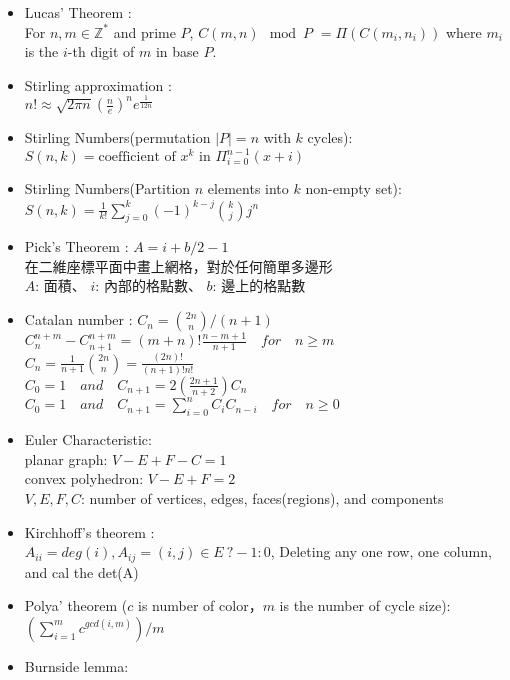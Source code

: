 \begin{itemize}
\item Lucas’ Theorem :\\
  For $n, m \in \mathbb{Z}^{*}$ and prime $P$,
  $C(m,n) \mod P$
	$= \Pi ( C(m_i,n_i) )$
  where $m_i$ is the $i$-th digit of $m$ in base $P$.
\item Stirling approximation : \\
  $n!\approx\sqrt{ 2 \pi n}(\frac{n}{e})^{n}e^\frac{1}{12n}$
\item Stirling Numbers(permutation $|P|=n$ with $k$ cycles): \\
  $S(n,k) = \text{coefficient of }x^k \text{ in } \Pi_{i=0}^{n-1} (x+i)$
\item Stirling Numbers(Partition $n$ elements into $k$ non-empty set): \\
  $S(n,k) = \frac{1}{k!} \sum\limits_{j=0}^k (-1)^{k-j} {k \choose j} j^n$
\item Pick’s Theorem : $A = i + b/2 - 1$\\
	在二維座標平面中畫上網格，對於任何簡單多邊形\\
  $A$: 面積、 $i$: 內部的格點數、 $b$: 邊上的格點數
\item Catalan number : $C_n = {2n \choose n}/(n+1)$\\
  $C^{n+m}_{n}-C^{n+m}_{n+1} = (m+n)! \frac{n-m+1}{n+1}\quad for \quad  n \ge m$\\
  $C_n = \frac{1}{n+1}{2n \choose n} = \frac{(2n)!}{(n+1)!n!}$\\
  $C_0 = 1 \quad  and \quad C_{n+1}= 2(\frac{2n+1}{n+2})C_n$\\
  $C_0 = 1 \quad  and \quad C_{n+1} = \sum_{i=0}^{n} C_iC_{n-i} \quad for \quad  n \ge 0$
\item Euler Characteristic: \\
  planar graph: $V-E+F-C=1$ \\
  convex polyhedron: $V-E+F=2$ \\
  $V,E,F,C$: number of vertices, edges, faces(regions), and components
\item Kirchhoff's theorem : \\
  $A_{ii} = deg(i), A_{ij} = (i,j) \in E\ ? -1 : 0$,
  Deleting any one row, one column, and cal the det(A)
\item Polya' theorem ($c$ is number of color，$m$ is the number of cycle size): \\
  $(\sum_{i=1}^{m}{c^{gcd(i,m)}})/m$
\item Burnside lemma: \\

\end{itemize}
